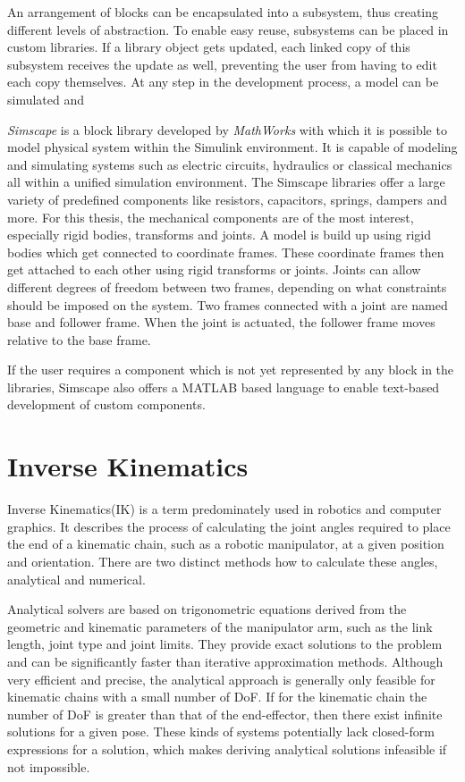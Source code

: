 An arrangement of blocks can be encapsulated into a subsystem, thus creating different levels of abstraction.
To enable easy reuse, subsystems can be placed in custom libraries.
If a library object gets updated, each linked copy of this subsystem receives the update as well, preventing the user from having to edit each copy themselves.
At any step in the development process, a model can be simulated and 

\textit{Simscape\textsuperscript{\texttrademark}} is a block library developed by \textit{MathWorks\textsuperscript{\textregistered}} with which it is possible to model physical system within the Simulink environment.
It is capable of modeling and simulating systems such as electric circuits, hydraulics or classical mechanics all within a unified simulation environment.
The Simscape libraries offer a large variety of predefined components like resistors, capacitors, springs, dampers and more.
For this thesis, the mechanical components are of the most interest, especially rigid bodies, transforms and joints.
A model is build up using rigid bodies which get connected to coordinate frames.
These coordinate frames then get attached to each other using rigid transforms or joints.
Joints can allow different degrees of freedom between two frames, depending on what constraints should be imposed on the system.
Two frames connected with a joint are named base and follower frame.
When the joint is actuated, the follower frame moves relative to the base frame\parencite{thilderkvist2015motion}.

If the user requires a component which is not yet represented by any block in the libraries, Simscape also offers a MATLAB based language to enable text-based development of custom components.

\section{Inverse Kinematics}
Inverse Kinematics(IK) is a term predominately used in robotics and computer graphics.
It describes the process of calculating the joint angles required to place the end of a kinematic chain, such as a robotic manipulator, at a given position and orientation.
There are two distinct methods how to calculate these angles, analytical and numerical.

Analytical solvers are based on trigonometric equations derived from the geometric and kinematic parameters of the manipulator arm, such as the link length, joint type and joint limits.
They provide exact solutions to the problem and can be significantly faster than iterative approximation methods.
Although very efficient and precise, the analytical approach is generally only feasible for kinematic chains with a small number of DoF.
If for the kinematic chain the number of DoF is greater than that of the end-effector, then there exist infinite solutions for a given pose.
These kinds of systems potentially lack closed-form expressions for a solution, which makes deriving analytical solutions infeasible if not impossible.


